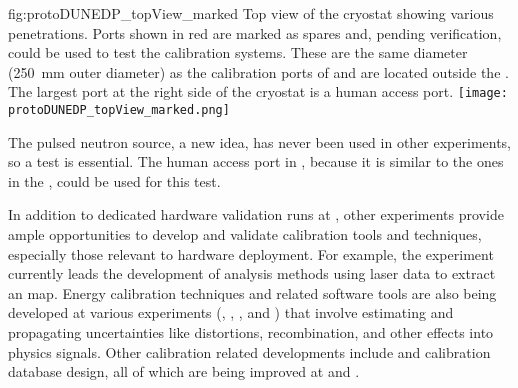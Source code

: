 \begin{dunefigure}{fig:protoDUNEDP_topView_marked}
{Top view of the  cryostat showing various penetrations. Ports shown in red are marked as spares and, pending verification, could be used to test the calibration systems. These are the same diameter (\SI{250}{\milli\m} outer diameter) as the calibration ports of   and are located outside the . The largest port at the right side of the cryostat is a human access port.}
\texttt{[image: protoDUNEDP\_topView\_marked.png]}
\end{dunefigure}

The pulsed neutron source, a new idea, has never been used in other experiments, so a  test is essential. The human access port in , because it is similar to the ones in the  , could be used for this test.


In addition to dedicated hardware validation runs at , other  experiments provide ample opportunities to develop and validate calibration tools and techniques, especially those relevant to hardware deployment. For example, the  experiment currently leads the development of analysis methods using laser data to extract an \efield map. Energy calibration techniques and related software tools are also being developed at various experiments (, , , and ) that involve estimating and propagating uncertainties like \efield distortions, recombination, and other effects into physics signals. Other calibration related developments include  and calibration database design, all of which are being improved at  and .
 

